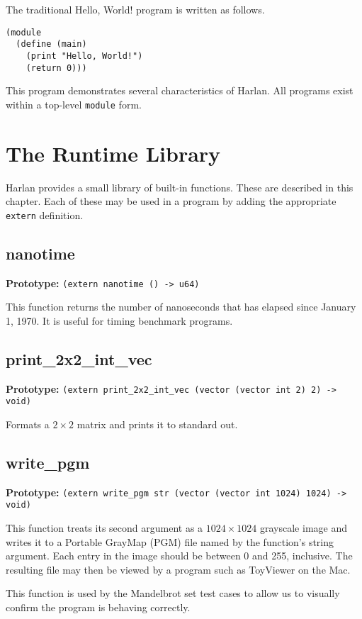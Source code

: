 \documentclass{book}
\begin{document}
The traditional Hello, World! program is written as follows.

\begin{lstlisting}
(module
  (define (main)
    (print "Hello, World!")
    (return 0)))
\end{lstlisting}

This program demonstrates several characteristics of Harlan. All
programs exist within a top-level \lstinline{module} form. 

\chapter{The Runtime Library}

Harlan provides a small library of built-in functions. These are
described in this chapter. Each of these may be used in a program by
adding the appropriate \lstinline{extern} definition.

\section{nanotime}

\textbf{Prototype:} \lstinline{(extern nanotime () -> u64)}

This function returns the number of nanoseconds that has elapsed since
January 1, 1970. It is useful for timing benchmark programs.

\section{print\_2x2\_int\_vec}

\textbf{Prototype:} \lstinline{(extern print_2x2_int_vec (vector (vector int 2) 2) -> void)}

Formats a $2 \times 2$ matrix and prints it to standard out.


\section{write\_pgm}

\textbf{Prototype:} \lstinline{(extern write_pgm str (vector (vector int 1024) 1024) -> void)}

This function treats its second argument as a $1024 \times 1024$
grayscale image and writes it to a Portable GrayMap (PGM) file named
by the function's string argument. Each entry in the image should be
between 0 and 255, inclusive. The resulting file may then be viewed by
a program such as ToyViewer on the Mac.

This function is used by the Mandelbrot set test cases to allow us to
visually confirm the program is behaving correctly.
\end{document}
